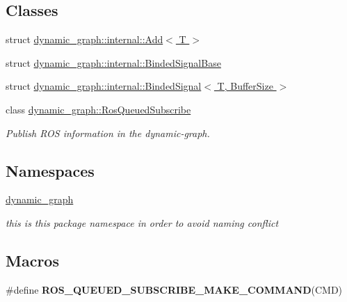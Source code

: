 \subsection*{Classes}
\begin{DoxyCompactItemize}
\item 
struct \hyperlink{structdynamic__graph_1_1internal_1_1Add}{dynamic\+\_\+graph\+::internal\+::\+Add$<$ T $>$}
\item 
struct \hyperlink{structdynamic__graph_1_1internal_1_1BindedSignalBase}{dynamic\+\_\+graph\+::internal\+::\+Binded\+Signal\+Base}
\item 
struct \hyperlink{structdynamic__graph_1_1internal_1_1BindedSignal}{dynamic\+\_\+graph\+::internal\+::\+Binded\+Signal$<$ T, Buffer\+Size $>$}
\item 
class \hyperlink{classdynamic__graph_1_1RosQueuedSubscribe}{dynamic\+\_\+graph\+::\+Ros\+Queued\+Subscribe}
\begin{DoxyCompactList}\small\item\em Publish R\+OS information in the dynamic-\/graph. \end{DoxyCompactList}\end{DoxyCompactItemize}
\subsection*{Namespaces}
\begin{DoxyCompactItemize}
\item 
 \hyperlink{namespacedynamic__graph}{dynamic\+\_\+graph}
\begin{DoxyCompactList}\small\item\em this is this package namespace in order to avoid naming conflict \end{DoxyCompactList}\end{DoxyCompactItemize}
\subsection*{Macros}
\begin{DoxyCompactItemize}
\item 
\#define {\bfseries R\+O\+S\+\_\+\+Q\+U\+E\+U\+E\+D\+\_\+\+S\+U\+B\+S\+C\+R\+I\+B\+E\+\_\+\+M\+A\+K\+E\+\_\+\+C\+O\+M\+M\+A\+ND}(C\+MD)
\end{DoxyCompactItemize}
